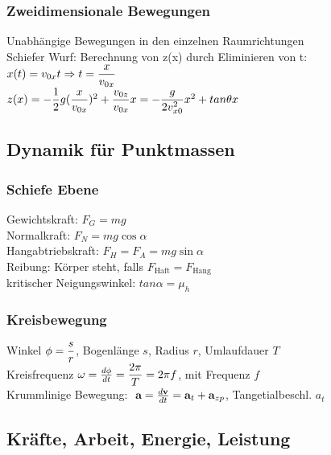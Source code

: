 \documentclass[fs, footer]{latex4ei}
\begin{document}
\begin{multicols*}{4}
\subsubsection{Zweidimensionale Bewegungen}
Unabhängige Bewegungen in den einzelnen Raumrichtungen\\
Schiefer Wurf:
Berechnung von z(x) durch Eliminieren von t: \\$x(t) = v_{0x}t \Rightarrow t = \dfrac{x}{v_{0x}}$\\
$z(x) = -\dfrac{1}{2}g(\dfrac{{x}}{v_{0x}})^2 + \dfrac{v_{0z}}{v_{0x}}x = -\dfrac{g}{2v^2_{x0}}x^2 + tan\theta x$\\
\subsection{Dynamik für Punktmassen}
\subsubsection{Schiefe Ebene}
Gewichtskraft: $F_G = mg$\\
Normalkraft: $F_N = mg\cos \alpha$\\
Hangabtriebskraft: $F_H = F_A = mg\sin \alpha$\\
Reibung: Körper steht, falls $F_{\text{Haft}} = F_{\text{Hang}}$\\
kritischer Neigungswinkel: $tan \alpha = \mu_h$\\
\subsubsection{Kreisbewegung}
Winkel $\phi = \dfrac{s}{r}$, 	Bogenlänge $s$, Radius $r$, Umlaufdauer $T$\\
Kreisfrequenz $\omega = \frac{d\phi}{dt} = \dfrac{2\pi}{T} = 2\pi f$, mit	Frequenz $f$\\
Krummlinige Bewegung: $\ \textbf{a} = \frac{d\textbf{v}}{dt} = \textbf{a}_t + \textbf{a}_{zp}$,	Tangetialbeschl. $a_t$\\

\subsection{Kräfte, Arbeit, Energie, Leistung}

\end{multicols*}
\end{document}
